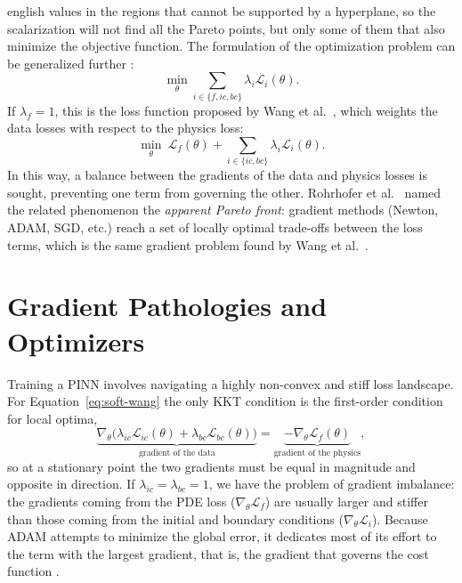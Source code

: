 \documentclass[11pt,letterpaper,twoside,openright]{book} %
\newcommand{\Loss}{\mathcal{L}}
\begin{document}
\begin{hyphenrules}{english}
values in the regions that cannot be supported by a hyperplane, so the scalarization will not find all
the Pareto points, but only some of them that also minimize the objective function. The formulation of
the optimization problem can be generalized further \cite{rohrhofer2023}:
\begin{equation}
  \min_{\theta}\sum_{i\in\{f,ic,bc\}}\lambda_i\Loss_i(\theta).
  \label{eq:soft-general}
\end{equation}
If $\lambda_f=1$, this is the loss function proposed by Wang et al.~\cite{wang2021gradient}, which weights the
data losses with respect to the physics loss:
\begin{equation}
  \min_{\theta}\ \Loss_f(\theta)+\sum_{i\in\{ic,bc\}}\lambda_i\Loss_i(\theta).
  \label{eq:soft-wang}
\end{equation}
In this way, a balance between the gradients of the data and physics losses is sought, preventing one
term from governing the other. Rohrhofer et al.~\cite{rohrhofer2023} named the related phenomenon the \emph{apparent
Pareto front}: gradient methods (Newton, ADAM, SGD, etc.) reach a set of locally optimal trade-offs
between the loss terms, which is the same gradient problem found by Wang et al.~\cite{wang2021gradient}.

\section{Gradient Pathologies and Optimizers}\label{sec:gradient-pathologies}

Training a PINN involves navigating a highly non-convex and stiff loss landscape. For
Equation~\eqref{eq:soft-wang} the only KKT condition is the first-order condition for local optima,
\begin{equation}
  \underbrace{\nabla_\theta\big(\lambda_{ic}\Loss_{ic}(\theta)+\lambda_{bc}\Loss_{bc}(\theta)\big)}_{\text{gradient of the data}}
  =\underbrace{-\nabla_\theta\Loss_f(\theta)}_{\text{gradient of the physics}},
  \label{eq:kkt-soft}
\end{equation}
so at a stationary point the two gradients must be equal in magnitude and opposite in direction. If
$\lambda_{ic}=\lambda_{bc}=1$, we have the problem of gradient imbalance: the gradients coming from the
PDE loss ($\nabla_\theta\Loss_f$) are usually larger and stiffer than those coming from the initial and
boundary conditions ($\nabla_\theta\Loss_i$). Because ADAM attempts to minimize the global error, it
dedicates most of its effort to the term with the largest gradient, that is, the gradient that governs
the cost function \cite{wang2021gradient}.


\end{hyphenrules}
\end{document}
